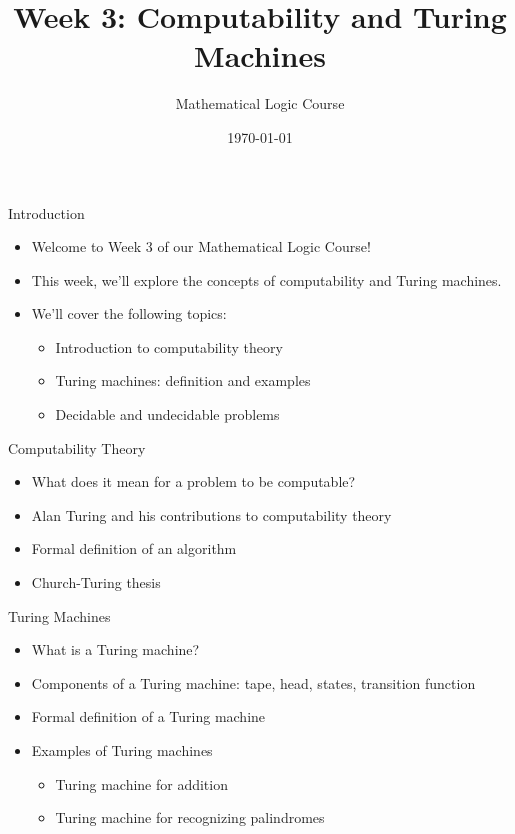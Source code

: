 \documentclass[presentation]{beamer}
\author{Mathematical Logic Course}
\date{\today}
\title{Week 3: Computability and Turing Machines}
\begin{document}
\maketitle

\begin{frame}[label={sec:orgddc7838}]{Introduction}
\begin{itemize}
\item Welcome to Week 3 of our Mathematical Logic Course!
\item This week, we'll explore the concepts of computability and Turing machines.
\item We'll cover the following topics:
\begin{itemize}
\item Introduction to computability theory
\item Turing machines: definition and examples
\item Decidable and undecidable problems
\end{itemize}
\end{itemize}
\end{frame}

\begin{frame}[label={sec:orgb6b02bf}]{Computability Theory}
\begin{itemize}
\item What does it mean for a problem to be computable?
\item Alan Turing and his contributions to computability theory
\item Formal definition of an algorithm
\item Church-Turing thesis
\end{itemize}
\end{frame}

\begin{frame}[label={sec:org2a3370d}]{Turing Machines}
\begin{itemize}
\item What is a Turing machine?
\item Components of a Turing machine: tape, head, states, transition function
\item Formal definition of a Turing machine
\item Examples of Turing machines
\begin{itemize}
\item Turing machine for addition
\item Turing machine for recognizing palindromes
\end{itemize}
\end{itemize}
\end{frame}
\end{document}
